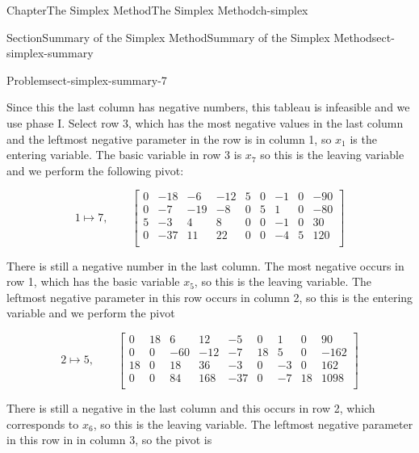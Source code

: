 \documentclass[oneside,10pt,]{book}
\numberwithin{equation}{section}
\newcommand{\amp}{&}
\begin{document}
\begin{chapterptx}{Chapter}{The Simplex Method}{}{The Simplex Method}{}{}{ch-simplex}
\begin{sectionptx}{Section}{Summary of the Simplex Method}{}{Summary of the Simplex Method}{}{}{sect-simplex-summary}
\begin{problem}{Problem}{}{sect-simplex-summary-7}
\begin{equation*}
\end{equation*}
%
\par
Since this the last column has negative numbers, this tableau is infeasible and we use phase I. Select row 3, which has the most negative values in the last column and the leftmost negative parameter in the row is in column 1, so \(x_1\) is the entering variable. The basic variable in row 3  is \(x_7\) so this is the leaving variable and we perform the following pivot:%
\par
%
\begin{equation*}
1 \mapsto 7, \qquad \left[\begin{array}{rrrr|rrrr|r} 0 \amp -18 \amp -6 \amp -12 \amp 5 \amp 0 \amp -1 \amp 0 \amp -90\\ 0 \amp -7 \amp -19 \amp -8 \amp 0 \amp 5 \amp 1 \amp 0 \amp -80\\ 5 \amp -3 \amp 4 \amp 8 \amp 0 \amp 0 \amp -1 \amp 0 \amp 30\\ \hline 0 \amp -37 \amp 11 \amp 22 \amp 0 \amp 0 \amp -4 \amp 5 \amp 120\\ \end{array} \right]
\end{equation*}
%
\par
There is still a negative number in the last column. The most negative occurs in row 1, which has the basic variable \(x_5\), so this is the leaving variable. The leftmost negative parameter in this row occurs in column 2, so this is the entering variable and we perform the pivot%
\par
%
\begin{equation*}
2 \mapsto 5, \qquad \left[\begin{array}{rrrr|rrrr|r} 0 \amp 18 \amp 6 \amp 12 \amp -5 \amp 0 \amp 1 \amp 0 \amp 90\\ 0 \amp 0 \amp -60 \amp -12 \amp -7 \amp 18 \amp 5 \amp 0 \amp -162\\ 18 \amp 0 \amp 18 \amp 36 \amp -3 \amp 0 \amp -3 \amp 0 \amp 162\\ \hline 0 \amp 0 \amp 84 \amp 168 \amp -37 \amp 0 \amp -7 \amp 18 \amp 1098\\ \end{array} \right]
\end{equation*}
%
\par
There is still a negative in the last column and this occurs in row 2, which corresponds to \(x_6\), so this is the leaving variable. The leftmost negative parameter in this row in in column 3, so the pivot is%
\par

\end{problem}
\end{sectionptx}
\end{chapterptx}
\end{document}
